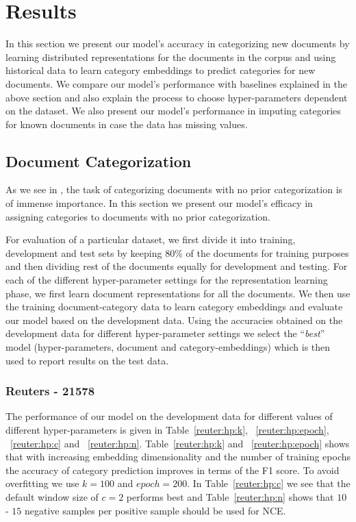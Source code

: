 \section{Results}
\label{sec:results}
In this section we present our model's accuracy in categorizing new documents by learning distributed representations for the documents in the corpus and using historical data to learn category embeddings to predict categories for new documents. We compare our model's performance with baselines explained in the above section and also explain the process to choose hyper-parameters dependent on the dataset. 
We also present our model's performance in imputing categories for known documents in case the data has missing values. 

\subsection{Document Categorization}
\label{sec:results:categorization}
As we see in , the task of categorizing documents with no prior categorization is of immense importance. In this section we present our model's efficacy in assigning categories to documents with no prior categorization. 

For evaluation of a particular dataset, we first divide it into training, development and test sets by keeping $80\%$ of the documents for training purposes and then dividing rest of the documents equally for development and testing. For each of the different hyper-parameter settings for the representation learning phase, we first learn document representations for all the documents. We then use the training document-category data to learn category embeddings and evaluate our model based on the development data. Using the accuracies obtained on the development data for different hyper-parameter settings we select the ``\emph{best}'' model (hyper-parameters, document and category-embeddings) which is then used to report results on the test data.

\subsubsection{Reuters - 21578}
The performance of our model on the development data for different values of different hyper-parameters is given in Table~\ref{reuter:hp:k}, ~\ref{reuter:hp:epoch}, ~\ref{reuter:hp:c} and ~\ref{reuter:hp:n}. Table~\ref{reuter:hp:k} and ~\ref{reuter:hp:epoch} shows that with increasing embedding dimensionality and the number of training epochs the accuracy of category prediction improves in terms of the F1 score. To avoid overfitting we use $k = 100$ and $epoch = 200$. In Table~\ref{reuter:hp:c} we see that the default window size of $c=2$ performs best and Table~\ref{reuter:hp:n} shows that $10$ - $15$ negative samples per positive sample should be used for NCE.

